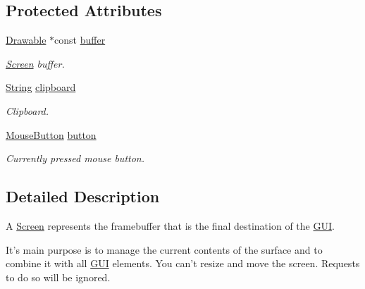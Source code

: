 \subsection*{Protected Attributes}
\begin{DoxyCompactItemize}
\item 
\hypertarget{classGUI_1_1Screen_a30b34167fe1aad767a0f7fcfd617ddfa}{\hyperlink{classGUI_1_1Drawable}{Drawable} $\ast$const \hyperlink{classGUI_1_1Screen_a30b34167fe1aad767a0f7fcfd617ddfa}{buffer}}\label{classGUI_1_1Screen_a30b34167fe1aad767a0f7fcfd617ddfa}

\begin{DoxyCompactList}\small\item\em \hyperlink{classGUI_1_1Screen}{Screen} buffer. \end{DoxyCompactList}\item 
\hypertarget{classGUI_1_1Screen_ae1bac72316cf4d07b19c2e4ae497e272}{\hyperlink{classGUI_1_1String}{String} \hyperlink{classGUI_1_1Screen_ae1bac72316cf4d07b19c2e4ae497e272}{clipboard}}\label{classGUI_1_1Screen_ae1bac72316cf4d07b19c2e4ae497e272}

\begin{DoxyCompactList}\small\item\em Clipboard. \end{DoxyCompactList}\item 
\hypertarget{classGUI_1_1Screen_a76597fbd366faf61d3a26f698e82e1f7}{\hyperlink{namespaceGUI_ad06082a7b02aa73697f39eb8e0856de9}{Mouse\-Button} \hyperlink{classGUI_1_1Screen_a76597fbd366faf61d3a26f698e82e1f7}{button}}\label{classGUI_1_1Screen_a76597fbd366faf61d3a26f698e82e1f7}

\begin{DoxyCompactList}\small\item\em Currently pressed mouse button. \end{DoxyCompactList}\end{DoxyCompactItemize}


\subsection{Detailed Description}
A \hyperlink{classGUI_1_1Screen}{Screen} represents the framebuffer that is the final destination of the \hyperlink{namespaceGUI}{G\-U\-I}. 

It's main purpose is to manage the current contents of the surface and to combine it with all \hyperlink{namespaceGUI}{G\-U\-I} elements. You can't resize and move the screen. Requests to do so will be ignored.

